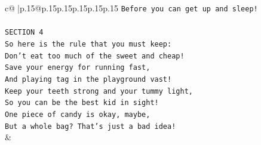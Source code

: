 \documentclass{article}
\begin{document}
{\begin{supertabular}{c@{$\;$}|p{.15\linewidth}@{}p{.15\linewidth}p{.15\linewidth}p{.15\linewidth}p{.15\linewidth}p{.15\linewidth}}
{{{\texttt{Before you can get up and sleep!} \\
\\ 
\texttt{SECTION 4} \\
\texttt{So here is the rule that you must keep:} \\
\texttt{Don't eat too much of the sweet and cheap!} \\
\texttt{Save your energy for running fast,} \\
\texttt{And playing tag in the playground vast!} \\
\texttt{Keep your teeth strong and your tummy light,} \\
\texttt{So you can be the best kid in sight!} \\
\texttt{One piece of candy is okay, maybe,} \\
\texttt{But a whole bag? That's just a bad idea!} \\
            }
        }
    }
    & \\ \\


\end{supertabular}}
\end{document}
